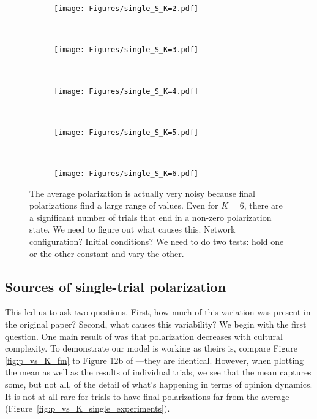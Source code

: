 \documentclass[11pt,letterpaper]{article}
\begin{document}

\begin{figure}[h!]
  \centering
  \begin{subfigure}[t]{\textwidth}
    \centering
    \texttt{[image: Figures/single\_S\_K=2.pdf]}
  \end{subfigure} \\
  \begin{subfigure}[t]{0.49\textwidth}
      \centering
      \texttt{[image: Figures/single\_S\_K=3.pdf]}
  \end{subfigure}
  ~
  \begin{subfigure}[t]{0.49\textwidth}
      \centering
      \texttt{[image: Figures/single\_S\_K=4.pdf]}
  \end{subfigure} \\
  \begin{subfigure}[t]{0.49\textwidth}
      \centering
      \texttt{[image: Figures/single\_S\_K=5.pdf]}
  \end{subfigure}
  ~
  \begin{subfigure}[t]{0.49\textwidth}
      \centering
      \texttt{[image: Figures/single\_S\_K=6.pdf]}
  \end{subfigure}
  \caption{The average polarization is actually very noisy because 
    final polarizations find a large range of values. Even for $K=6$, there
    are a significant number of trials that end in a non-zero polarization
    state. We need to figure out what causes this. Network configuration?
    Initial conditions? We need to do two tests: hold one or the other 
    constant and vary the other.
  }
  \label{fig:single_S_K}
\end{figure}

\subsection{Sources of single-trial polarization}

This led us to ask two questions. First, how much of this variation was 
present in the original  paper? Second, what causes
this variability? We begin with the first question. One main result of
 was that polarization decreases with cultural complexity.
To demonstrate our model is working as theirs is, compare Figure 
\ref{fig:p_vs_K_fm} to Figure 12b of ---they are identical.
However, when plotting the mean as well as the results of individual trials,
we see that the mean captures some, but not all, of the detail of what's 
happening in terms of opinion dynamics. It is not at all rare for trials to
have final polarizations far from the average 
(Figure~\ref{fig:p_vs_K_single_experiments}). 
\end{document}
